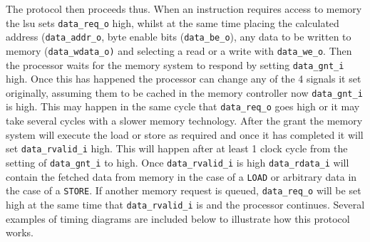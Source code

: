 The protocol then proceeds thus. When an instruction requires access to memory the \gls{lsu} sets \texttt{data\_req\_o} high, whilst at the same time placing the calculated address (\texttt{data\_addr\_o}, byte enable bits (\texttt{data\_be\_o}), any data to be written to memory (\texttt{data\_wdata\_o)} and selecting a read or a write with \texttt{data\_we\_o}. Then the processor waits for the memory system to respond by setting \texttt{data\_gnt\_i} high. Once this has happened the processor can change any of the 4 signals it set originally, assuming them to be cached in the memory controller now \texttt{data\_gnt\_i} is high. This may happen in the same cycle that \texttt{data\_req\_o} goes high or it may take several cycles with a slower memory technology. After the grant the memory system will execute the load or store as required and once it has completed it will set \texttt{data\_rvalid\_i} high. This will happen after at least 1 clock cycle from the setting of \texttt{data\_gnt\_i} to high. Once \texttt{data\_rvalid\_i} is high \texttt{data\_rdata\_i} will contain the fetched data from memory in the case of a \texttt{LOAD} or arbitrary data in the case of a \texttt{STORE}. If another memory request is queued, \texttt{data\_req\_o} will be set high at the same time that \texttt{data\_rvalid\_i} is and the processor continues. Several examples of timing diagrams are included below to illustrate how this protocol works.
	
